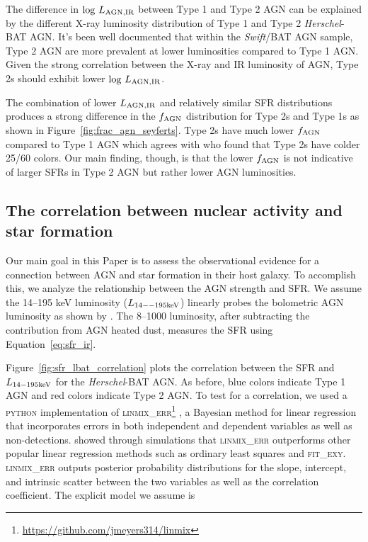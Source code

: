 \documentclass[fleqn, usenatbib]{mnras}
\newcommand{\herschel}{\emph{Herschel}}
\newcommand{\swift}{\textit{Swift}}
\begin{document}
The difference in $\log\,L_{\rm AGN,IR}$ between Type 1 and Type 2 AGN can be explained by the different X-ray luminosity distribution of Type 1 and Type 2 \herschel-BAT AGN. It's been well documented  \citep[e.g.][]{Burlon:2011pi, Melendez:2014yu} that within the \swift/BAT AGN sample, Type 2 AGN are more prevalent at lower luminosities compared to Type 1 AGN. Given the strong correlation between the X-ray and IR luminosity of AGN, Type 2s should exhibit lower $\log\,L_{\rm AGN,IR}$.

The combination of lower $L_{\rm AGN,IR}$ and relatively similar SFR distributions produces a strong difference in the $f_{\rm AGN}$ distribution for Type 2s and Type 1s as shown in Figure~\ref{fig:frac_agn_seyferts}. Type 2s have much lower $f_{\rm AGN}$ compared to Type 1 AGN which agrees with \citet{Melendez:2008pd} who found that Type 2s have colder 25/60 \micron{} colors. Our main finding, though, is that the lower $f_{\rm AGN}$ is not indicative of larger SFRs in Type 2 AGN but rather lower AGN luminosities. 

\subsection{The correlation between nuclear activity and star formation}
Our main goal in this Paper is to assess the observational evidence for a connection between AGN and star formation in their host galaxy. To accomplish this, we analyze the relationship between the AGN strength and SFR. We assume the 14--195 keV luminosity ($L_{\rm 14--195 keV}$) linearly probes the bolometric AGN luminosity as shown by \citet{Winter:2012yq}. The 8--1000 \micron{} luminosity, after subtracting the contribution from AGN heated dust, measures the SFR using Equation~\ref{eq:sfr_ir}.

Figure~\ref{fig:sfr_lbat_correlation} plots the correlation between the SFR and $L_{\rm 14-195 keV}$ for the \herschel-BAT AGN. As before, blue colors indicate Type 1 AGN and red colors indicate Type 2 AGN. To test for a correlation, we used a \textsc{python} implementation of \textsc{linmix\_err}\footnote{\url{https://github.com/jmeyers314/linmix}} \citep{Kelly:2007lr}, a Bayesian method for linear regression that incorporates errors in both independent and dependent variables as well as non-detections. \citet{Kelly:2007lr} showed through simulations that \textsc{linmix\_err} outperforms other popular linear regression methods such as ordinary least squares and \textsc{fit\_exy}. \textsc{linmix\_err} outputs posterior probability distributions for the slope, intercept, and intrinsic scatter between the two variables as well as the correlation coefficient. The explicit model we assume is 
\end{document}
